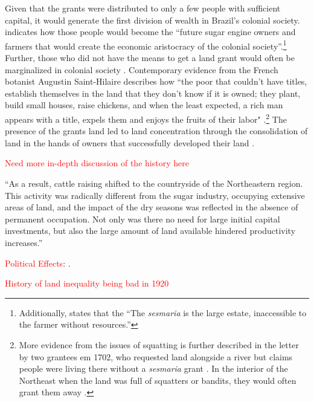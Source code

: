 \documentclass[11pt]{article}
\newcommand{\red}[1]{\textcolor{red}{#1}}
\begin{document}
Given that the grants were distributed to only a few people with sufficient capital, it would generate the first division of wealth in Brazil's colonial society.
\textcite[p.~36]{Lima1954-td} indicates how those people would become the ``future sugar engine owners and farmers that would create the economic aristocracy of the colonial society''.\footnote{Additionally, \textcite[p.~47]{Lima1954-td} states that the ``The \textit{sesmaria} is the large estate, inaccessible to the farmer without resources.''} 
Further, those who did not have the means to get a land grant would often be marginalized in colonial society \parencite{Simonsen2005-ps}.
Contemporary evidence from the French botanist Augustin Saint-Hilaire describes how ``the poor that couldn't have titles, establish themselves in the land that they don't know if it is owned; they plant, build small houses, raise chickens, and when the least expected, a rich man appears with a title, expels them and enjoys the fruits of their labor" \parencite[p.~143]{Da_Costa_Porto1979-dz}.\footnote{More evidence from the issues of squatting is further described in the letter by two grantees em 1702, who requested land alongside a river but claims people were living there without a \textit{sesmaria} grant \parencite[p.~142]{Da_Costa_Porto1979-dz}. In the interior of the Northeast when the land was full of squatters or bandits, they would often grant them away \parencite[p.~88]{Poppino1968-ab}.}
The presence of the grants land led to land concentration through the consolidation of land in the hands of owners that successfully developed their land \parencite{Manchester1931-zw}.

\red{Need more in-depth discussion of the history here}

``As a result, cattle raising shifted to the countryside of the Northeastern region.  This  activity was radically different from the sugar industry, occupying extensive areas of land, and  the impact of the dry seasons was reflected in the absence of permanent occupation.  Not only was there no need for large initial capital investments, but also the large  amount of land available hindered productivity increases.''\parencite[p.~117]{Bertola2017-hr}

\red{Political Effects}: \parencite{Leal2012-gj}.

\red{History of land inequality being bad in 1920 \parencite[p.~124]{Bertola2017-hr}}

\end{document}
